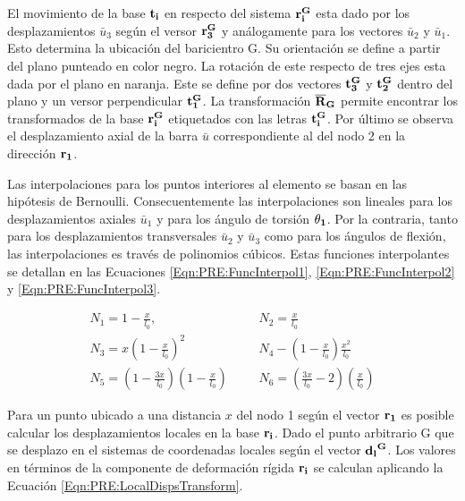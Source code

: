 El movimiento de la base $\bf{t_i}$ en respecto del sistema $\bf{r_i^G}$ esta dado por los desplazamientos  $\bar{u}_3$ según el versor  $\bf{r_3^G}$ y análogamente para los vectores $\bar{u}_2$ y $\bar{u}_1$. Esto determina la ubicación del baricientro G. Su orientación se define a partir del plano punteado en color negro. La rotación de este respecto de tres ejes esta dada por el plano en naranja. Este se define por dos vectores $\bf{t_3^G}$ y $\bf{t_2^G}$ dentro del plano y un versor perpendicular $\bf{t_1^G}$. La transformación $\bf{\overline{R}}_G$ permite encontrar  los transformados de la base $\bf{r_i^G}$ etiquetados con las letras $\bf{t_i^G}$. Por último se observa el desplazamiento axial de la barra $\bar{u}$ correspondiente al del nodo 2 en la dirección $\bf{r_1}$.

Las interpolaciones para los puntos interiores al elemento se basan en las hipótesis de Bernoulli. Consecuentemente las interpolaciones son lineales para los desplazamientos axiales $\bar{u}_1$ y para los ángulo de torsión $\bf{\theta_1}$. Por la contraria, tanto para los desplazamientos transversales $\bar{u}_2$ y $\bar{u}_3$  como para los ángulos de flexión, las interpolaciones es través de polinomios cúbicos. Estas funciones interpolantes se detallan en las Ecuaciones \eqref{Eqn:PRE:FuncInterpol1}, \eqref{Eqn:PRE:FuncInterpol2} y \eqref{Eqn:PRE:FuncInterpol3}.

\begin{eqnarray}
		\label{Eqn:PRE:FuncInterpol1}
 		N_1 = 1 - \frac{x}{l_0},   		&~~~~& 	N_2= \frac{x}{l_0}\\
 		\label{Eqn:PRE:FuncInterpol2}
 		N_3 = x\left(1 - \frac{x}{l_0}\right)^2 	&~~~~&  N_4 - \left( 1 - \frac{x}{l_0} \right ) \frac{x^2}{l_0} \\
 		\label{Eqn:PRE:FuncInterpol3}
 		N_5 = \left(1 - \frac{3x}{l_0}\right) \left(1 - \frac{x}{l_0}\right) 	&~~~~&  N_6 =\left( \frac{3x}{l_0}-2\right) \left(\frac{x}{l_0}\right)
\end{eqnarray}

Para un punto ubicado a una distancia $x$ del nodo 1 según el vector $\bf{r_1}$ es posible calcular los desplazamientos locales en la base $\bf{r_i}$. Dado el punto arbitrario G que se desplazo en el sistemas de coordenadas locales según el vector $\bf{d_l}^G$. Los valores en términos de la componente de deformación rígida $\bf{r_i}$ se calculan aplicando la Ecuación \ref{Eqn:PRE:LocalDispsTransform}.

